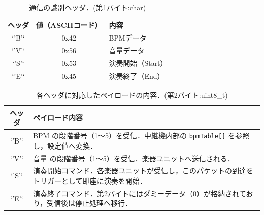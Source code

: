 \documentclass[lualatex,book,paper=a4paper,jafontsize=11.5pt,jafontscale=1.05]{jlreq}
\begin{document}
\begin{table}[H]
\centering
\caption{通信の識別ヘッダ．(第1バイト:char)}
\label{tab:hed}
\begin{tabular}{c|c|l}
\hline
ヘッダ & 値（ASCIIコード） & 内容 \\ \hline
`'B'` & 0x42 & BPMデータ \\ \hline
`'V'` & 0x56 & 音量データ \\ \hline
`'S'` & 0x53 & 演奏開始（Start） \\ \hline
`'E'` & 0x45 & 演奏終了（End） \\ \hline
\end{tabular}
\end{table}

\begin{table}[H]
\centering
\caption{各ヘッダに対応したペイロードの内容．(第2バイト:uint8\_t)}
\label{tab:payload}
\begin{tabular}{c|p{22em}}
\hline
ヘッダ & ペイロード内容 \\ \hline
`'B'` & BPM の段階番号（1～5）を受信．中継機内部の \texttt{bpmTable[]} を参照し，設定値へ変換． \\ \hline
`'V'` & 音量 の段階番号（1～5）を受信．楽器ユニットへ送信される． \\ \hline
`'S'` & 演奏開始コマンド．各楽器ユニットが受信し，このパケットの到達をトリガーとして即座に演奏を開始． \\ \hline
`'E'` & 演奏終了コマンド．第2バイトにはダミーデータ（0）が格納されており，受信後は停止処理へ移行． \\ \hline
\end{tabular}
\end{table}
\end{document}
